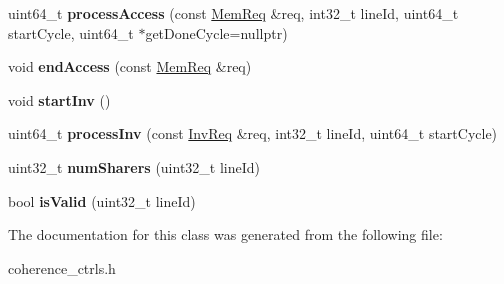 \begin{DoxyCompactItemize}
\item 
\hypertarget{classMESITerminalCC_a3c47894ac0d31aed1fef4a66f4a2ac04}{uint64\-\_\-t {\bfseries process\-Access} (const \hyperlink{structMemReq}{Mem\-Req} \&req, int32\-\_\-t line\-Id, uint64\-\_\-t start\-Cycle, uint64\-\_\-t $\ast$get\-Done\-Cycle=nullptr)}\label{classMESITerminalCC_a3c47894ac0d31aed1fef4a66f4a2ac04}

\item 
\hypertarget{classMESITerminalCC_a648c7b00a16e95ac97f7efae7d97c431}{void {\bfseries end\-Access} (const \hyperlink{structMemReq}{Mem\-Req} \&req)}\label{classMESITerminalCC_a648c7b00a16e95ac97f7efae7d97c431}

\item 
\hypertarget{classMESITerminalCC_a2cc6d5b9501e12509bd9318932cf7ab8}{void {\bfseries start\-Inv} ()}\label{classMESITerminalCC_a2cc6d5b9501e12509bd9318932cf7ab8}

\item 
\hypertarget{classMESITerminalCC_a08ccd1bd159752c51a17f77a8a21d493}{uint64\-\_\-t {\bfseries process\-Inv} (const \hyperlink{structInvReq}{Inv\-Req} \&req, int32\-\_\-t line\-Id, uint64\-\_\-t start\-Cycle)}\label{classMESITerminalCC_a08ccd1bd159752c51a17f77a8a21d493}

\item 
\hypertarget{classMESITerminalCC_a4ef3939c2efc0847d3b4329d48b6f2d4}{uint32\-\_\-t {\bfseries num\-Sharers} (uint32\-\_\-t line\-Id)}\label{classMESITerminalCC_a4ef3939c2efc0847d3b4329d48b6f2d4}

\item 
\hypertarget{classMESITerminalCC_af790a8b2ff504692b53f907bc24b9cc1}{bool {\bfseries is\-Valid} (uint32\-\_\-t line\-Id)}\label{classMESITerminalCC_af790a8b2ff504692b53f907bc24b9cc1}

\end{DoxyCompactItemize}


The documentation for this class was generated from the following file\-:\begin{DoxyCompactItemize}
\item 
coherence\-\_\-ctrls.\-h\end{DoxyCompactItemize}
